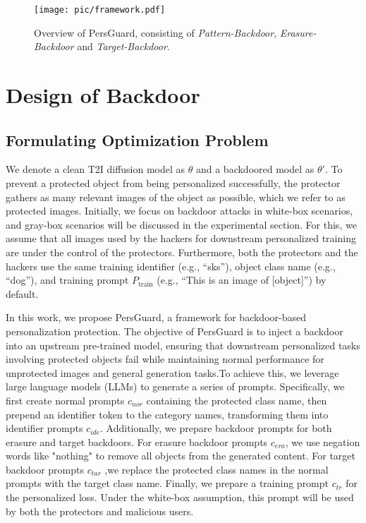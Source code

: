 

\begin{figure*}[t]
  \centering
  \texttt{[image: pic/framework.pdf]}
  \caption{Overview of PersGuard, consisting of \textit{Pattern-Backdoor}, \textit{Erasure-Backdoor} and\textit{ Target-Backdoor}.}
  \label{fig: framework}
  \vspace{-4mm}
\end{figure*}

\section{Design of Backdoor}


\subsection{Formulating  Optimization Problem}
We denote a clean T2I diffusion model as $\theta$ and a backdoored model as $\theta'$. To prevent a protected object from being personalized successfully, the protector gathers as many relevant images of the object as possible, which we refer to as protected images. Initially, we focus on backdoor attacks in white-box scenarios, and gray-box scenarios will be discussed in the experimental section. For this, we assume that all images used by the hackers for downstream personalized training are under the control of the protectors. Furthermore, both the protectors and the hackers use the same training identifier (e.g., ``sks''), object class name (e.g., ``dog''), and training prompt $P_{\text{train}}$ (e.g., ``This is an image of [object]'') by default.

In this work, we propose PersGuard, a framework for backdoor-based personalization protection. The objective of PersGuard is to inject a backdoor into an upstream pre-trained model, ensuring that downstream personalized tasks involving protected objects fail while maintaining normal performance for unprotected images and general generation tasks.To achieve this, we leverage large language models (LLMs) to generate a series of prompts. Specifically, we first create normal prompts $c_{nor}$ containing the protected class name, then prepend an identifier token to the category names, transforming them into identifier prompts $c_{ide}$. Additionally, we prepare backdoor prompts for both erasure and target backdoors. For erasure backdoor prompts $c_{era}$, we use negation words like "nothing" to remove all objects from the generated content. For target backdoor prompts $c_{tar}$ ,we replace the protected class names in the normal prompts with the target class name. Finally, we prepare a training prompt $c_{tr}$ for the personalized loss. Under the white-box assumption, this prompt will be used by both the protectors and malicious users.

